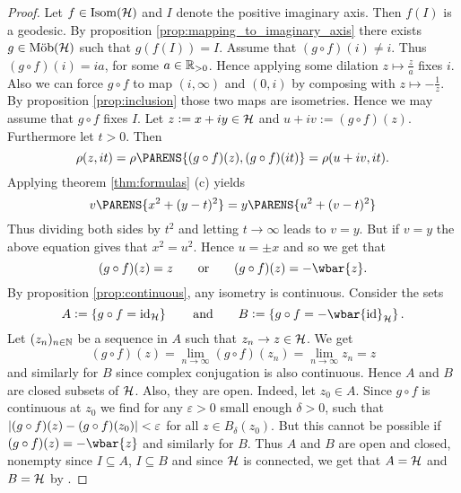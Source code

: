 \begin{proof}
	Let $f \in \mathrm{Isom}(\mathcal{H})$ and $I$ denote the positive imaginary axis. Then $f(I)$ is a geodesic. By proposition \ref{prop:mapping_to_imaginary_axis} there exists $g \in \mathrm{M\ddot{o}b}(\mathcal{H})$ such that $g(f(I)) = I$. Assume that $(g \circ f)(i) \neq i$. Thus $(g \circ f)(i) = ia$, for some $a \in \mathbb{R}_{>0}$. Hence applying some dilation $z \mapsto \frac{z}{a}$ fixes $i$. Also we can force $g \circ f$ to map $(i,\infty)$ and $(0,i)$ by composing with $z \mapsto -\frac{1}{z}$. By proposition \ref{prop:inclusion} those two maps are isometries. Hence we may assume that $g \circ f$ fixes $I$. Let $z := x + iy \in \mathcal{H}$ and $u + iv := (g \circ f )(z)$. Furthermore let $t > 0$. Then
	\begin{equation*}
		\rho(z,it) = \rho\PARENS{(g \circ f)(z),(g \circ f)(it)} = \rho(u + iv, it).
	\end{equation*}
	Applying theorem \ref{thm:formulas} (c) yields
	\begin{equation*}
		v\PARENS{x^2 + (y - t)^2} = y\PARENS{u^2 + (v - t)^2}
	\end{equation*}
	Thus dividing both sides by $t^2$ and letting $t \to \infty$ leads to $v = y$. But if $v = y$ the above equation gives that $x^2 = u^2$. Hence $u = \pm x$ and so we get that
	\begin{equation*}
		(g \circ f)(z) = z \qquad \text{or} \qquad (g \circ f)(z) = - \wbar{z}.
	\end{equation*}
	By proposition \ref{prop:continuous}, any isometry is continuous. Consider the sets
	\begin{equation*}
		A := \cbr[0]{g \circ f = \id_\Hcal} \qquad \text{and} \qquad B := \cbr[0]{g \circ f = - \wbar{\id}_\Hcal}.
	\end{equation*}
	Let $(z_n)_{n \in \mathbb{N}}$ be a sequence in $A$ such that $z_n \to z \in \mathcal{H}$. We get
	\begin{equation*}
		(g \circ f)(z) = \lim_{n \to \infty} (g \circ f)(z_n) = \lim_{n \to \infty} z_n = z
	\end{equation*}
	\noindent and similarly for $B$ since complex conjugation is also continuous. Hence $A$ and $B$ are closed subsets of $\mathcal{H}$. Also, they are open. Indeed, let $z_0 \in A$. Since $g \circ f$ is continuous at $z_0$ we find for any $\varepsilon > 0$ small enough $\delta > 0$, such that $\abs[0]{(g \circ f)(z) - (g \circ f)(z_0)} < \varepsilon$ for all $z \in B_\delta(z_0)$. But this cannot be possible if $(g \circ f)(z) = - \wbar{z}$ and similarly for $B$. Thus $A$ and $B$ are open and closed, nonempty since $I \subseteq A$, $I \subseteq B$ and since $\mathcal{H}$ is connected, we get that $A = \mathcal{H}$ and $B = \mathcal{H}$ by \cite[86]{lee:topological_manifolds:2011}. 

\end{proof}
